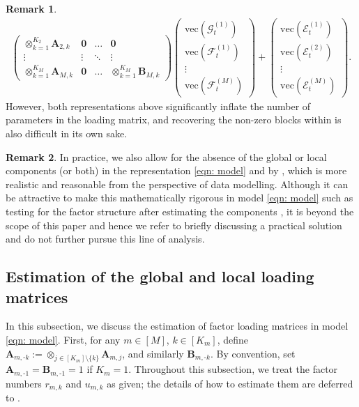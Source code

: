 \documentclass[aos]{imsart}
\theoremstyle{plain}
\theoremstyle{definition}
\newtheorem{remark}{Remark}
\def\cE{\mathcal{E}}
\def\cF{\mathcal{F}}
\def\cG{\mathcal{G}} \def\cH{\boldsymbol{\mathcal{H}}} \def\cI{\mathcal{I}}
\def\zero{\mathbf{0}}
\def\bA{\mathbf{A}}
\def\bB{\mathbf{B}}
\def\vec{\mathrm{vec}}
\begin{document}
\begin{remark}
{\begin{align*}
\begin{pmatrix}
    \otimes_{k=1}^{K_2} \bA_{2,k} & \zero & \ldots & \zero \\
    \vdots & \vdots &  \ddots & \vdots \\
    \otimes_{k=1}^{K_M} \bA_{M,k} & \zero &  \ldots & \otimes_{k=1}^{K_M} \bB_{M,k}
    \end{pmatrix} \begin{pmatrix}
    \vec(\cG_t^{(1)}) \\ \vec(\cF_t^{(1)}) \\ \vdots \\ \vec(\cF_t^{(M)})
    \end{pmatrix} + \begin{pmatrix}
    \vec(\cE_t^{(1)}) \\ \vec(\cE_t^{(2)}) \\ \vdots \\ \vec(\cE_t^{(M)})
    \end{pmatrix} .
\end{align*}
}
However, both representations above significantly inflate the number of parameters in the loading matrix, and recovering the non-zero blocks within is also difficult in its own sake.
\end{remark}


\begin{remark}
\label{remark: absent_component}
In practice, we also allow for the absence of the global or local components (or both) in the representation \eqref{eqn: model} and by , which is more realistic and reasonable from the perspective of data modelling. Although it can be attractive to make this mathematically rigorous in model \eqref{eqn: model} such as testing for the factor structure after estimating the components \citep[e.g.][for matrix time series]{Heetal2023}, it is beyond the scope of this paper and hence we refer to  briefly discussing a practical solution and do not further pursue this line of analysis.
\end{remark}






\subsection{Estimation of the global and local loading matrices}
\label{subsec: est_loading}

In this subsection, we discuss the estimation of factor loading matrices in model \eqref{eqn: model}. First, for any $m\in[M]$, $k\in[K_m]$, define $\bA_{m,\text{-}k} := \otimes_{j\in[K_m] \setminus\{k\}} \bA_{m,j}$, and similarly $\bB_{m,\text{-}k}$. By convention, set $\bA_{m,\text{-}1}= \bB_{m,\text{-}1}= 1$ if $K_m=1$. Throughout this subsection, we treat the factor numbers $r_{m,k}$ and $u_{m,k}$ as given; the details of how to estimate them are deferred to .
\end{document}
